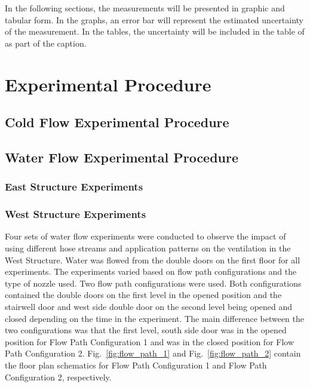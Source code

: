 \documentclass[12pt,oneside]{book}
\begin{document}

In the following sections, the measurements will be presented in graphic and tabular form. In the graphs, an error bar will represent the estimated uncertainty of the measurement. In the tables, the uncertainty will be included in the table of as part of the caption.

\section{Experimental Procedure}
\label{sec:Experimental_Procedure}

\subsection{Cold Flow Experimental Procedure}
\label{sec:Cold_Flow_Procedure}

\subsection{Water Flow Experimental Procedure}
\label{sec:Water_Flow_Procedure}

\subsubsection{East Structure Experiments}
\label{sec:East_Structure_Water_Flow_Procedure}

\subsubsection{West Structure Experiments}
\label{sec:West_Structure_Water_Flow_Procedure}

Four sets of water flow experiments were conducted to observe the impact of using different hose streams and application patterns on the ventilation in the West Structure. Water was flowed from the double doors on the first floor for all experiments. The experiments varied based on flow path configurations and the type of nozzle used. Two flow path configurations were used. Both configurations contained the double doors on the first level in the opened position and the stairwell door and west side double door on the second level being opened and closed depending on the time in the experiment. The main difference between the two configurations was that the first level, south side door was in the opened position for Flow Path Configuration 1 and was in the closed position for Flow Path Configuration 2. Fig.~\ref{fig:flow_path_1} and Fig.~\ref{fig:flow_path_2} contain the floor plan schematics for Flow Path Configuration 1 and Flow Path Configuration 2, respectively.
\end{document}
